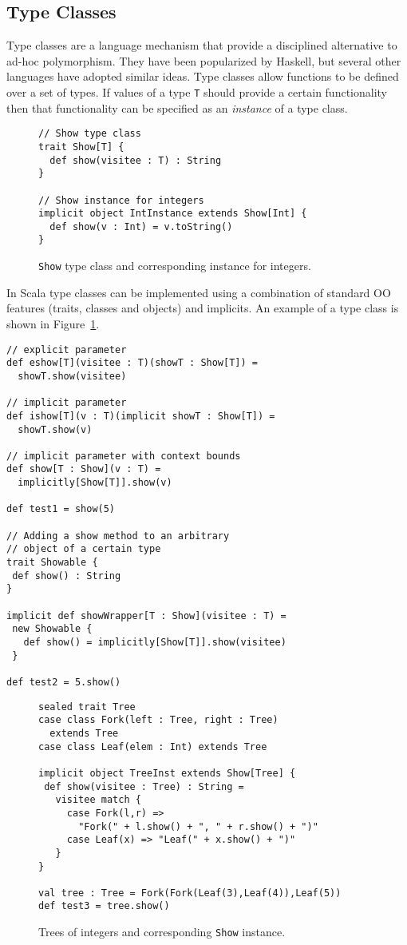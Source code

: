 \documentclass[preprint]{sigplanconf}
\begin{document}
\subsection{Type Classes}
\label{sec:type-classes}

Type classes are a language mechanism that provide a disciplined
alternative to ad-hoc polymorphism. They have been popularized by
Haskell, but several other languages have adopted similar ideas.  Type
classes allow functions to be defined over a set of types.  If values
of a type \lstinline{T} should provide a certain functionality then that
functionality can be specified as an \emph{instance} of a type class.

\begin{figure}
\begin{lstlisting}
// Show type class
trait Show[T] {
  def show(visitee : T) : String
}

// Show instance for integers
implicit object IntInstance extends Show[Int] {
  def show(v : Int) = v.toString()
}
\end{lstlisting}
\caption{\lstinline{Show} type class and corresponding instance for
  integers.}
\label{fig:showtc}
\end{figure}

In Scala type classes can be implemented using a combination of 
standard OO features (traits, classes and objects) and implicits. 
An example of a type class is shown in Figure~\ref{fig:showtc}.

\begin{lstlisting}
// explicit parameter
def eshow[T](visitee : T)(showT : Show[T]) = 
  showT.show(visitee)
	
// implicit parameter
def ishow[T](v : T)(implicit showT : Show[T]) = 
  showT.show(v)
	
// implicit parameter with context bounds
def show[T : Show](v : T) = 
  implicitly[Show[T]].show(v) 
	
def test1 = show(5) 
	
// Adding a show method to an arbitrary 
// object of a certain type
trait Showable {
 def show() : String
}
	
implicit def showWrapper[T : Show](visitee : T) = 
 new Showable {
   def show() = implicitly[Show[T]].show(visitee)
 } 
	
def test2 = 5.show()
\end{lstlisting}	


\begin{figure}
\begin{lstlisting}	
sealed trait Tree 
case class Fork(left : Tree, right : Tree) 
  extends Tree
case class Leaf(elem : Int) extends Tree
	
implicit object TreeInst extends Show[Tree] {
 def show(visitee : Tree) : String = 
   visitee match {
     case Fork(l,r) => 
       "Fork(" + l.show() + ", " + r.show() + ")"
     case Leaf(x) => "Leaf(" + x.show() + ")"
   }
}
	
val tree : Tree = Fork(Fork(Leaf(3),Leaf(4)),Leaf(5))
def test3 = tree.show()
\end{lstlisting}
\caption{Trees of integers and corresponding \lstinline{Show} instance.}
\end{figure}
\end{document}
